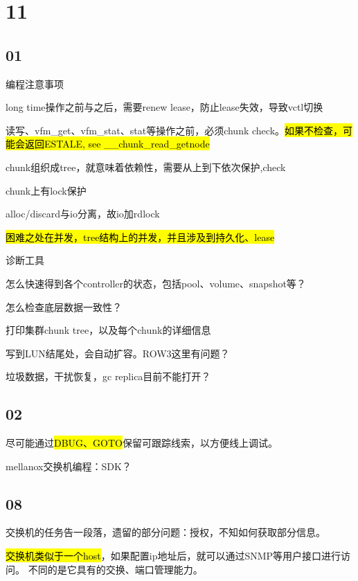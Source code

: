 \section{11}

\subsection{01}

编程注意事项
\begin{enumbox}
\item long time操作之前与之后，需要renew lease，防止lease失效，导致vctl切换
\item 读写、vfm\_get、vfm\_stat、stat等操作之前，必须chunk check。\hl{如果不检查，可能会返回ESTALE, see \_\_chunk\_read\_getnode}
\item chunk组织成tree，就意味着依赖性，需要从上到下依次保护,check
\item chunk上有lock保护
\item alloc/discard与io分离，故io加rdlock
\item \hl{困难之处在并发，tree结构上的并发，并且涉及到持久化、lease}
\end{enumbox}

诊断工具
\begin{enumbox}
\item 怎么快速得到各个controller的状态，包括pool、volume、snapshot等？
\item 怎么检查底层数据一致性？
\item 打印集群chunk tree，以及每个chunk的详细信息
\end{enumbox}

写到LUN结尾处，会自动扩容。ROW3这里有问题？

垃圾数据，干扰恢复，gc replica目前不能打开？

\subsection{02}

尽可能通过\hl{DBUG、GOTO}保留可跟踪线索，以方便线上调试。

mellanox交换机编程：SDK？

\subsection{08}

交换机的任务告一段落，遗留的部分问题：授权，不知如何获取部分信息。

\hl{交换机类似于一个host}，如果配置ip地址后，就可以通过SNMP等用户接口进行访问。
不同的是它具有的交换、端口管理能力。

